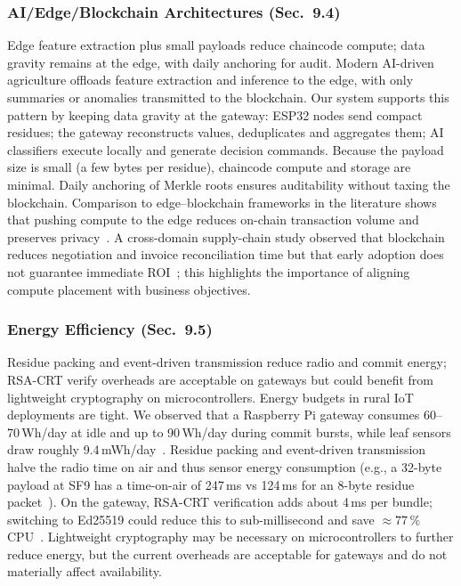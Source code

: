 \documentclass[12pt,onecolumn]{IEEEtran} %
\begin{document}
\subsubsection{AI/Edge/Blockchain Architectures (Sec.~9.4)}
Edge feature extraction plus small payloads reduce chaincode compute; data gravity remains at the edge, with daily anchoring for audit. Modern AI-driven agriculture offloads feature extraction and inference to the edge, with only summaries or anomalies transmitted to the blockchain. Our system supports this pattern by keeping data gravity at the gateway: ESP32 nodes send compact residues; the gateway reconstructs values, deduplicates and aggregates them; AI classifiers execute locally and generate decision commands. Because the payload size is small (a few bytes per residue), chaincode compute and storage are minimal. Daily anchoring of Merkle roots ensures auditability without taxing the blockchain. Comparison to edge–blockchain frameworks in the literature shows that pushing compute to the edge reduces on-chain transaction volume and preserves privacy~\cite{gsci_blockchain_supplychain_2022}. A cross-domain supply-chain study observed that blockchain reduces negotiation and invoice reconciliation time but that early adoption does not guarantee immediate ROI~\cite{gsci_blockchain_supplychain_2022}; this highlights the importance of aligning compute placement with business objectives.

\subsubsection{Energy Efficiency (Sec.~9.5)}
Residue packing and event-driven transmission reduce radio and commit energy; RSA-CRT verify overheads are acceptable on gateways but could benefit from lightweight cryptography on microcontrollers. Energy budgets in rural IoT deployments are tight. We observed that a Raspberry Pi gateway consumes 60–70\,Wh/day at idle and up to 90\,Wh/day during commit bursts, while leaf sensors draw roughly 9.4\,mWh/day~\cite{ref76853680998234}. Residue packing and event-driven transmission halve the radio time on air and thus sensor energy consumption (e.g., a 32-byte payload at SF9 has a time-on-air of 247\,ms vs 124\,ms for an 8-byte residue packet~\cite{ref76853680998234}). On the gateway, RSA-CRT verification adds about 4\,ms per bundle; switching to Ed25519 could reduce this to sub-millisecond and save $\approx77\,\%$ CPU~\cite{ref76853680998234}. Lightweight cryptography may be necessary on microcontrollers to further reduce energy, but the current overheads are acceptable for gateways and do not materially affect availability.
\end{document}
